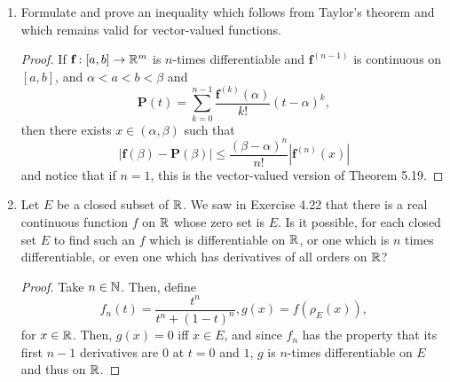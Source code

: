 \begin{enumerate}[1.]
\begin{enumerate}
\begin{proof}
\begin{align*}
                    &\le (1 + 2M)\epsilon
            \end{align*}
            completing the proof.
        \end{proof}
    \item If $f'$ is continuous in $(-1, 1)$, then $D_n \to f'(0)$.
        \begin{proof}
            Constructing $\gamma_n$ as in part (a), we have 
            \[
                \lim_{n \to \infty} D_n = \lim_{n \to \infty} f'(\gamma_n) = f'(0),
            \]
            since $f'$ is continuous, as required.
        \end{proof}
    \end{enumerate}
    Give an example in which $f$ is differentiable in $(-1, 1)$ (but $f'$ is not continous at $0$), and in which $\alpha_n, \beta_n$ tend to $0$ in a way that $\lim D_n$ exists but is different from $f'(0)$.
    
    \TODO
\item %
    Formulate and prove an inequality which follows from Taylor's theorem and which remains valid for vector-valued functions.
    \begin{proof}
        If $\textbf{f}: [a, b] \rightarrow \mathbb{R}^m$ is $n$-times differentiable and $\textbf{f}^{(n-1)}$ is continuous on $[a, b]$, and $\alpha < a < b < \beta$ and 
        \[
            \textbf{P}(t) = \sum_{k=0}^{n-1} \frac{\textbf{f}^{(k)}(\alpha)}{k!} (t - \alpha)^k,
        \]
        then there exists $x \in (\alpha, \beta)$ such that
        \[
            |\textbf{f}(\beta) - \textbf{P}(\beta)| \le \frac{(\beta-\alpha)^n}{n!} |\textbf{f}^{(n)}(x)|
        \]
        and notice that if $n = 1$, this is the vector-valued version of Theorem 5.19.

        \TODO
    \end{proof}

\item %
    Let $E$ be a closed subset of $\mathbb{R}$. We saw in Exercise 4.22 that there is a real continuous function $f$ on $\mathbb{R}$ whose zero set is $E$. Is it possible, for each closed set $E$ to find such an $f$ which is differentiable on $\mathbb{R}$, or one which is $n$ times differentiable, or even one which has derivatives of all orders on $\mathbb{R}$?

    \begin{proof}
        Take $n \in \mathbb{N}$. Then, define
        \[
            f_n(t) = \frac{t^n}{t^n + (1-t)^n},  g(x) = f(\rho_E(x)),
        \]
        for $x \in \mathbb{R}$. Then, $g(x) = 0$ iff $x \in E$, and since $f_n$ has the property that its first $n-1$ derivatives are 0 at $t=0$ and $1$, $g$ is $n$-times differentiable on $E$ and thus on $\mathbb{R}$.


\end{proof}
\end{enumerate}
